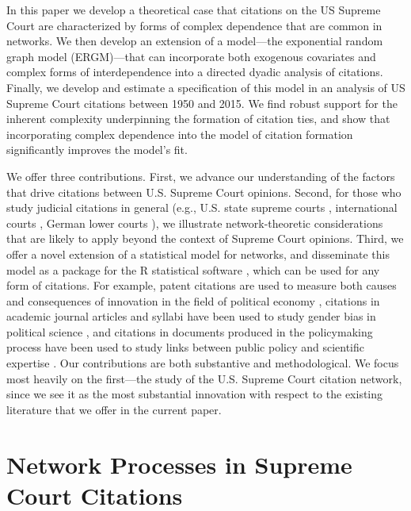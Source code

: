 \documentclass[headsepline=true, abstracton]{scrartcl}
\begin{document}
In this paper we develop a theoretical case that citations on the US Supreme Court are characterized by forms of complex dependence that are common in networks. We then develop an extension of a model---the exponential random graph model (ERGM)---that can incorporate both exogenous covariates and complex forms of interdependence into a directed dyadic analysis of citations. Finally, we develop and estimate a specification of this model in an analysis of US Supreme Court citations between 1950 and 2015. We find robust support for the inherent complexity underpinning the formation of citation ties, and show that incorporating complex dependence into the model of citation formation significantly improves the model's fit.

We offer three contributions. First, we advance our understanding of the factors that drive citations between U.S. Supreme Court opinions. Second, for those who study judicial citations in general (e.g., U.S. state supreme courts \citep{hinkle2016transmission}, international courts \citep{lupu2012precedent},  German lower courts \citep{berlemann2020disposition}), we illustrate network-theoretic considerations that are likely to apply beyond the context of Supreme Court opinions. Third, we offer a novel extension of a statistical model for networks, and disseminate this model as a package for the R statistical software \citep{cergm}, which can be used for any form of citations. For example, patent citations are used to measure both causes and consequences of innovation in the field of political economy \citep{akcigit2018growth,dincer2019does}, citations in academic journal articles and syllabi have been used to study gender bias in political science  \citep{dion2018gendered,maliniak2013gender,hardt2019gender,atchison2017negating}, and citations in documents produced in the policymaking process have been used to study links between public policy and scientific expertise \citep{costa2016science,koontz2018use,pattyn2020knowledge}. Our contributions are both substantive and methodological. We focus most heavily on the first---the study of the U.S. Supreme Court citation network, since we see it as the most substantial innovation with respect to the existing literature that we offer in the current paper.

\section{Network Processes in Supreme Court Citations} 
\end{document}
